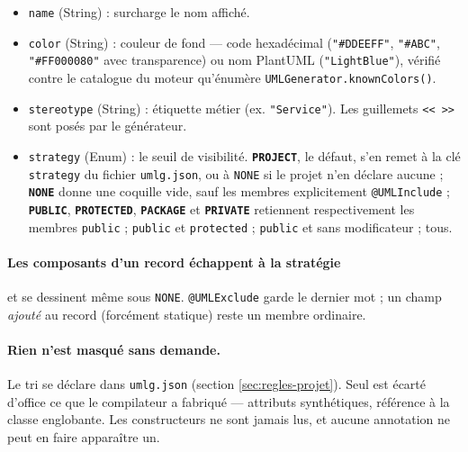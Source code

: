 \documentclass[12pt, a4paper]{article}
\begin{document}
\begin{itemize}
    \item \texttt{name} (String) : surcharge le nom affiché.
    \item \texttt{color} (String) : couleur de fond --- code hexadécimal (\texttt{"\#DDEEFF"}, \texttt{"\#ABC"}, \texttt{"\#FF000080"} avec transparence) ou nom PlantUML (\texttt{"LightBlue"}), vérifié contre le catalogue du moteur qu'énumère \texttt{UMLGenerator.knownColors()}.
    \item \texttt{stereotype} (String) : étiquette métier (ex. \texttt{"Service"}). Les guillemets \texttt{<<~>>} sont posés par le générateur.
    \item \texttt{strategy} (Enum) : le seuil de visibilité. \textbf{\texttt{PROJECT}}, le défaut, s'en remet à la clé \texttt{strategy} du fichier \texttt{umlg.json}, ou à \texttt{NONE} si le projet n'en déclare aucune ; \textbf{\texttt{NONE}} donne une coquille vide, sauf les membres explicitement \texttt{@UMLInclude} ; \textbf{\texttt{PUBLIC}}, \textbf{\texttt{PROTECTED}}, \textbf{\texttt{PACKAGE}} et \textbf{\texttt{PRIVATE}} retiennent respectivement les membres \texttt{public} ; \texttt{public} et \texttt{protected} ; \texttt{public} et sans modificateur ; tous.
\end{itemize}

\paragraph{Les composants d'un record échappent à la stratégie} et se dessinent même sous \texttt{NONE}. \texttt{@UMLExclude} garde le dernier mot ; un champ \textit{ajouté} au record (forcément statique) reste un membre ordinaire.

\paragraph{Rien n'est masqué sans demande.}
\label{sec:bruit}
Le tri se déclare dans \texttt{umlg.json} (section \ref{sec:regles-projet}). Seul est écarté d'office ce que le compilateur a fabriqué --- attributs synthétiques, référence à la classe englobante. Les constructeurs ne sont jamais lus, et aucune annotation ne peut en faire apparaître un.
\end{document}
